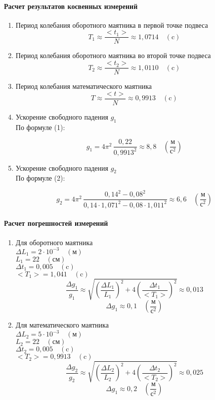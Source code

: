\documentclass{article}
\begin{document}
\paragraph{Расчет результатов косвенных измерений }
\begin{enumerate}
\item Период колебания оборотного маятника в первой точке подвеса
$$T_1\approx\frac{<t_1>}{N}\approx 1{,}0714\quad(\mbox{c}) $$
\item Период колебания оборотного маятника во второй точке подвеса
$$T_2\approx\frac{<t_2>}{N}\approx 1{,}0110\quad(\mbox{c})  $$
\item Период колебания математического маятника
$$T\approx\frac{<t>}{N}\approx 0{,}9913\quad(\mbox{c})  $$
\item Ускорение свободного падения $g_1$\\
По формуле (1):

$$ g_1=4\pi^2\,\frac{0,22}{0,9913^2}\approx8,8\quad\left(\frac{\mbox{м}}{\mbox{с}^2}\right)$$
\begin{center}
\end{center}


\item Ускорение свободного падения $g_2$\\
По формуле (2):

$$ g_2 = 4\pi^2\,\frac{0,14^2-0,08^2}{0,14\cdot1,071^2-0,08\cdot1,011^2}\approx6,6 \quad\left(\frac{\mbox{м}}{\mbox{с}^2}\right)$$
\begin{center}
\end{center}
\end{enumerate}

\paragraph{Расчет погрешностей измерений }
\begin{enumerate}
	\item Для оборотного маятника\\
	$\Delta L_1 =2\cdot10^{-3} \quad(\mbox{м})$\\
	$L_1 = 22 \quad(\mbox{см})$\\
	$\Delta t_1 = 0,005 \quad(\mbox{c})$\\
	$ <T_1>= 1,041 \quad(\mbox{c})$
	$$\frac{\Delta g_1}{g_1}\approx\sqrt{\left(\frac{\Delta L_1}{L_1}\right)^2+4\left(\frac{\Delta t_1}{<T_1>}\right)^2}\approx0,013$$
	$$ \Delta g_1\approx0,1\quad\left(\frac{\mbox{м}}{\mbox{с}^2}\right)$$
		\item Для математического маятника\\
	$\Delta L_2 =5\cdot10^{-3} \quad(\mbox{м})$\\
	$L_2 = 22 \quad(\mbox{см})$\\
	$\Delta t_2 = 0,005 \quad(\mbox{c})$\\
	$ <T_2>= 0,9913 \quad(\mbox{c})$
	$$\frac{\Delta g_2}{g_2}\approx\sqrt{\left(\frac{\Delta L_2}{L_2}\right)^2+4\left(\frac{\Delta t_2}{<T_2>}\right)^2}\approx0,025$$
	$$ \Delta g_1\approx0,2 \quad\left(\frac{\mbox{м}}{\mbox{с}^2}\right)$$
\end{enumerate}
\end{document}
